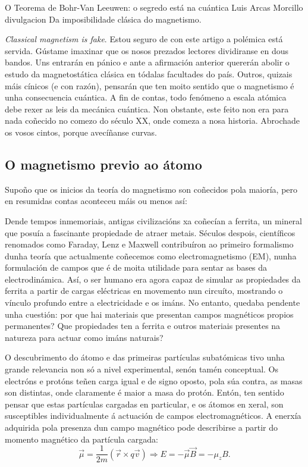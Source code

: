 \Titular%
{O Teorema de Bohr-Van Leeuwen: o segredo está na cuántica}%
{Luis Arcas Morcillo}%
{divulgacion}%
{Da imposibilidade clásica do magnetismo.}%


\begin{refsection}
\begin{multicols}{2}


\textit{Classical magnetism is fake}. Estou seguro de con este artigo a
polémica está servida. Gústame imaxinar que os nosos prezados lectores
dividiranse en dous bandos. Uns entrarán en pánico e ante a afirmación anterior
quererán abolir o estudo da magnetostática clásica en tódalas facultades do
país. Outros, quizais máis cínicos (e con razón), pensarán que ten moito
sentido que o magnetismo é unha consecuencia cuántica. A fin de contas, todo
fenómeno a escala atómica debe rexer as leis da mecánica cuántica. Non
obstante, este feito non era para nada coñecido no comezo do século XX, onde
comeza a nosa historia. Abrochade os vosos cintos, porque avecíñanse curvas.

\subsection*{O magnetismo previo ao átomo}

Supoño que os inicios da teoría do magnetismo son coñecidos pola maioría, pero
en resumidas contas aconteceu máis ou menos así:

Dende tempos inmemoriais, antigas civilizacións xa coñecían a ferrita, un
mineral que posuía a fascinante propiedade de atraer metais. Séculos despois,
científicos renomados como Faraday, Lenz e Maxwell contribuíron ao primeiro
formalismo dunha teoría que actualmente coñecemos como electromagnetismo (EM),
nunha formulación de campos que é de moita utilidade para sentar as bases da
electrodinámica. Así, o ser humano era agora capaz de simular as propiedades da
ferrita a partir de cargas eléctricas en movemento nun circuíto, mostrando o
vínculo profundo entre a electricidade e os imáns. No entanto, quedaba pendente
unha cuestión: por que hai materiais que presentan campos magnéticos propios
permanentes? Que propiedades ten a ferrita e outros materiais presentes na
natureza para actuar como imáns naturais?

O descubrimento do átomo e das primeiras partículas subatómicas tivo unha
grande relevancia non só a nivel experimental, senón tamén conceptual. Os
electróns e protóns teñen carga igual e de signo oposto, pola súa contra, as
masas son distintas, onde claramente é maior a masa do protón. Entón, ten
sentido pensar que estas partículas cargadas en particular, e os átomos en
xeral, son susceptibles individualmente á actuación de campos
electromagnéticos. A enerxía adquirida pola presenza dun campo magnético pode
describirse a partir do momento magnético da partícula cargada: 
\begin{equation}\label{ec.: energia_momento}
    \vec \mu = \frac{1}{2m}(\vec r\times q\vec v)\Longrightarrow E =
    -\vec \mu\vec B = -\mu_zB.
\end{equation}


\end{multicols}
\end{refsection}

